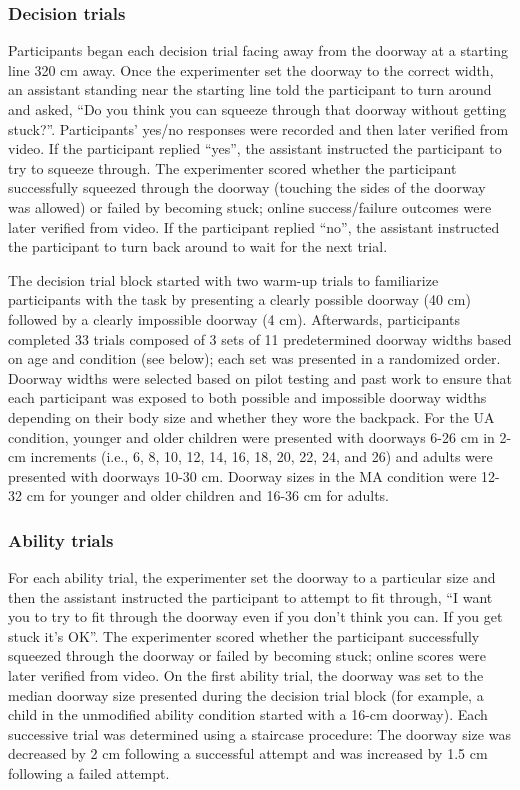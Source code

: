 \documentclass[a4paper,man,natbib,floatsintext,noextraspace]{apa6}
\begin{document}
\subsubsection{Decision trials}

Participants began each decision trial facing away from the doorway at a starting line 320 cm away. Once the experimenter set the doorway to the correct width, an assistant standing near the starting line told the participant to turn around and asked, “Do you think you can squeeze through that doorway without getting stuck?”. Participants’ yes/no responses were recorded and then later verified from video. If the participant replied “yes”, the assistant instructed the participant to try to squeeze through. The experimenter scored whether the participant successfully squeezed through the doorway (touching the sides of the doorway was allowed) or failed by becoming stuck; online success/failure outcomes were later verified from video. If the participant replied “no”, the assistant instructed the participant to turn back around to wait for the next trial.

The decision trial block started with two warm-up trials to familiarize participants with the task by presenting a clearly possible doorway (40 cm) followed by a clearly impossible doorway (4 cm). Afterwards, participants completed 33 trials composed of 3 sets of 11 predetermined doorway widths based on age and condition (see below); each set was presented in a randomized order. Doorway widths were selected based on pilot testing and past work \citep{Recal} to ensure that each participant was exposed to both possible and impossible doorway widths depending on their body size and whether they wore the backpack. For the UA condition, younger and older children were presented with doorways 6-26 cm in 2-cm increments (i.e., 6, 8, 10, 12, 14, 16, 18, 20, 22, 24, and 26) and adults were presented with doorways 10-30 cm. Doorway sizes in the MA condition were 12-32 cm for younger and older children and 16-36 cm for adults. 

\subsubsection{Ability trials}

For each ability trial, the experimenter set the doorway to a particular size and then the assistant instructed the participant to attempt to fit through, “I want you to try to fit through the doorway even if you don’t think you can. If you get stuck it’s OK”. The experimenter scored whether the participant successfully squeezed through the doorway or failed by becoming stuck; online scores were later verified from video. On the first ability trial, the doorway was set to the median doorway size presented during the decision trial block (for example, a child in the unmodified ability condition started with a 16-cm doorway). Each successive trial was determined using a staircase procedure: The doorway size was decreased by 2 cm following a successful attempt and was increased by 1.5 cm following a failed attempt.
\end{document}
